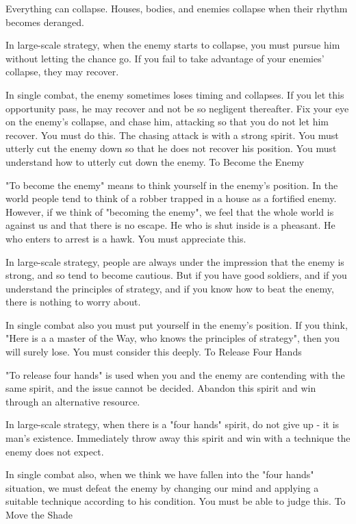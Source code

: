 Everything can collapse. Houses, bodies, and enemies collapse when their rhythm becomes deranged.

In large-scale strategy, when the enemy starts to collapse, you must pursue him without letting the chance go. If you fail to take advantage of your enemies' collapse, they may recover.

In single combat, the enemy sometimes loses timing and collapses. If you let this opportunity pass, he may recover and not be so negligent thereafter. Fix your eye on the enemy's collapse, and chase him, attacking so that you do not let him recover. You must do this. The chasing attack is with a strong spirit. You must utterly cut the enemy down so that he does not recover his position. You must understand how to utterly cut down the enemy.
To Become the Enemy

"To become the enemy" means to think yourself in the enemy's position. In the world people tend to think of a robber trapped in a house as a fortified enemy. However, if we think of "becoming the enemy", we feel that the whole world is against us and that there is no escape. He who is shut inside is a pheasant. He who enters to arrest is a hawk. You must appreciate this.

In large-scale strategy, people are always under the impression that the enemy is strong, and so tend to become cautious. But if you have good soldiers, and if you understand the principles of strategy, and if you know how to beat the enemy, there is nothing to worry about.

In single combat also you must put yourself in the enemy's position. If you think, "Here is a a master of the Way, who knows the principles of strategy", then you will surely lose. You must consider this deeply.
To Release Four Hands

"To release four hands" is used when you and the enemy are contending with the same spirit, and the issue cannot be decided. Abandon this spirit and win through an alternative resource.

In large-scale strategy, when there is a "four hands" spirit, do not give up - it is man's existence. Immediately throw away this spirit and win with a technique the enemy does not expect.

In single combat also, when we think we have fallen into the "four hands" situation, we must defeat the enemy by changing our mind and applying a suitable technique according to his condition. You must be able to judge this.
To Move the Shade

